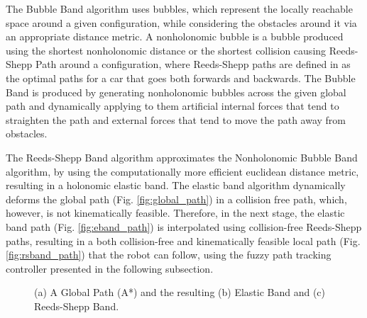 \documentclass[conference]{IEEEtran}
\begin{document}
The Bubble Band algorithm uses bubbles, which represent the locally reachable space around a given configuration, while considering the obstacles around it via an appropriate distance metric. A nonholonomic bubble is a bubble produced using the shortest nonholonomic distance \cite{rs_metric} or the shortest collision causing Reeds-Shepp Path around a configuration, where Reeds-Shepp paths are defined in \cite{reeds_shepp} as the optimal paths for a car that goes both forwards and backwards. The Bubble Band is produced by generating nonholonomic bubbles across the given global path and dynamically applying to them artificial internal forces that tend to straighten the path and external forces that tend to move the path away from obstacles.

The Reeds-Shepp Band algorithm approximates the Nonholonomic Bubble Band algorithm, by using the computationally more efficient euclidean distance metric, resulting in a holonomic elastic band. The elastic band \cite{eband} algorithm dynamically deforms the global path (Fig. \ref{fig:global_path}) in a collision free path, which, however, is not kinematically feasible. Therefore, in the next stage, the elastic band path (Fig. \ref{fig:eband_path}) is interpolated using collision-free Reeds-Shepp paths, resulting in a both collision-free and kinematically feasible local path (Fig. \ref{fig:rsband_path}) that the robot can follow, using the fuzzy path tracking controller presented in the following subsection.

\begin{figure}[!ht]
	\centering
	\hspace{0.05cm}
	\hspace{0.05cm}
	\caption{(a) A Global Path (A*) and the resulting (b) Elastic Band and (c) Reeds-Shepp Band.}
\end{figure}
\end{document}
